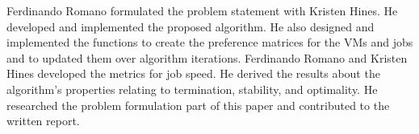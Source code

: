 \documentclass[conference]{IEEEtran}
\begin{document}
Ferdinando Romano formulated the problem statement
with Kristen Hines.  He developed and implemented the
proposed algorithm.  He also designed and implemented
the  functions to create the preference
matrices for the VMs and jobs and to updated them
over algorithm iterations.  Ferdinando Romano and
Kristen Hines developed the metrics for job speed.  He
derived the results about the algorithm's properties
relating to termination, stability, and optimality.  He
researched the problem formulation part of this paper
and contributed to the written report.











{}
\nocite{*}
%
\end{document}
